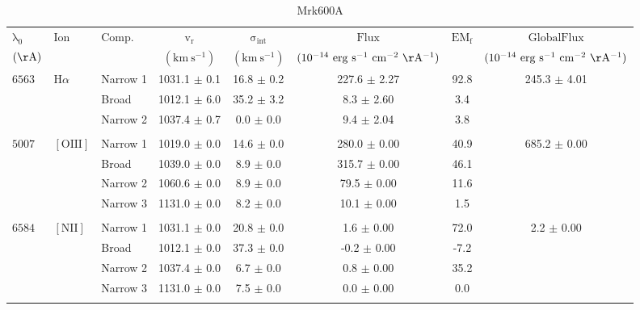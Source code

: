 \documentclass{article}
\begin{document}
\begin{table}[tbp]
\centering
\begin{tabular}{lllccccc}
\hline
$\mathrm{\lambda_0}$ & $\mathrm{Ion}$ & $\mathrm{Comp.}$ & $\mathrm{v_r}$ & $\mathrm{\sigma_{int}}$ & $\mathrm{Flux}$ & $\mathrm{EM_f}$ & $\mathrm{GlobalFlux}$ \\ 
$(\mathrm{\AA})$ &  &  & $(\mathrm{km \ s^{-1}})$ & $(\mathrm{km \ s^{-1}})$ & $(\mathrm{10^{-14} \ erg \ s^{-1} \ cm^{-2} \ \AA^{-1}})$ &  & $(\mathrm{10^{-14} \ erg \ s^{-1} \ cm^{-2} \ \AA^{-1}})$ \\ 
\hline
$6563$ & $\mathrm{H}\alpha$ & Narrow 1 & 1031.1 $\pm$ 0.1 & 16.8 $\pm$ 0.2 & 227.6 $\pm$ 2.27 & 92.8 & 245.3 $\pm$ 4.01 \\ 
 &  & Broad & 1012.1 $\pm$ 6.0 & 35.2 $\pm$ 3.2 & 8.3 $\pm$ 2.60 & 3.4 &  \\ 
 &  & Narrow 2 & 1037.4 $\pm$ 0.7 & 0.0 $\pm$ 0.0 & 9.4 $\pm$ 2.04 & 3.8 &  \\ 
 &  &  &  &  &  &  &  \\ 
$5007$ & $\mathrm{[OIII]}$ & Narrow 1 & 1019.0 $\pm$ 0.0 & 14.6 $\pm$ 0.0 & 280.0 $\pm$ 0.00 & 40.9 & 685.2 $\pm$ 0.00 \\ 
 &  & Broad & 1039.0 $\pm$ 0.0 & 8.9 $\pm$ 0.0 & 315.7 $\pm$ 0.00 & 46.1 &  \\ 
 &  & Narrow 2 & 1060.6 $\pm$ 0.0 & 8.9 $\pm$ 0.0 & 79.5 $\pm$ 0.00 & 11.6 &  \\ 
 &  & Narrow 3 & 1131.0 $\pm$ 0.0 & 8.2 $\pm$ 0.0 & 10.1 $\pm$ 0.00 & 1.5 &  \\ 
 &  &  &  &  &  &  &  \\ 
$6584$ & $\mathrm{[NII]}$ & Narrow 1 & 1031.1 $\pm$ 0.0 & 20.8 $\pm$ 0.0 & 1.6 $\pm$ 0.00 & 72.0 & 2.2 $\pm$ 0.00 \\ 
 &  & Broad & 1012.1 $\pm$ 0.0 & 37.3 $\pm$ 0.0 & -0.2 $\pm$ 0.00 & -7.2 &  \\ 
 &  & Narrow 2 & 1037.4 $\pm$ 0.0 & 6.7 $\pm$ 0.0 & 0.8 $\pm$ 0.00 & 35.2 &  \\ 
 &  & Narrow 3 & 1131.0 $\pm$ 0.0 & 7.5 $\pm$ 0.0 & 0.0 $\pm$ 0.00 & 0.0 &  \\ 
 &  &  &  &  &  &  &  \\ 
\hline
\end{tabular}
\caption{Mrk600A}
\end{table}
\end{document}
